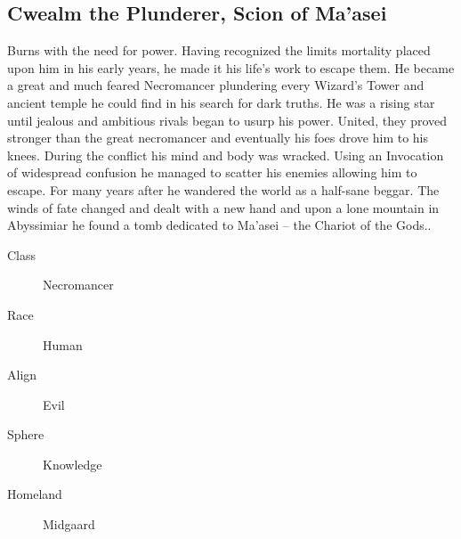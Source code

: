 \begin{multicols}{2}
\section{Cwealm the Plunderer, Scion of Ma'asei}
	Burns with the need for power. Having recognized the limits mortality placed upon him in his early years, he made it his life's work to escape them. He became a great and much feared Necromancer plundering every Wizard's Tower and ancient temple he could find in his search for dark truths. He was a rising star until jealous and ambitious rivals began to usurp his power. United, they proved stronger than the great necromancer and eventually his foes drove him to his knees. During the conflict his mind and body was wracked. Using an Invocation of widespread confusion he managed to scatter his enemies allowing him to escape. For many years after he wandered the world as a half-sane beggar. The winds of fate changed and dealt with a new hand and upon a lone mountain in Abyssimiar he found a tomb dedicated to Ma'asei – the Chariot of the Gods..
\begin{description}
  \item[Class] Necromancer
  \item[Race] Human
  \item[Align] Evil
  \item[Sphere] Knowledge
  \item[Homeland] Midgaard
\end{description}


\end{multicols}

